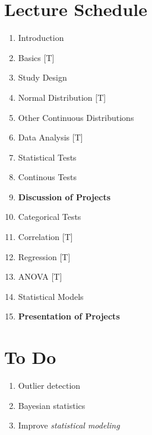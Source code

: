 \clearpage


\clearpage


\clearpage

\section{Lecture Schedule}

\begin{enumerate}
  \item Introduction
  \item Basics [T]
  \item Study Design
  \item Normal Distribution [T]
  \item Other Continuous Distributions
  \item Data Analysis [T]
  \item Statistical Tests
  \item Continous Tests
  \item \textbf{Discussion of Projects}
  \item Categorical Tests
  \item Correlation [T]
  \item Regression [T]
  \item ANOVA [T]
  \item Statistical Models
  \item \textbf{Presentation of Projects}
\end{enumerate}

\section{To Do}

\begin{enumerate}
  \item Outlier detection
  \item Bayesian statistics
  \item Improve \emph{statistical modeling}
\end{enumerate}
